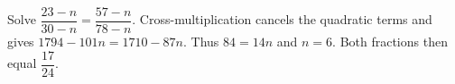 Solve $\dfrac{23-n}{30-n}=\dfrac{57-n}{78-n}$. Cross-multiplication cancels the quadratic terms and gives $1794-101n=1710-87n$. Thus $84=14n$ and $\boxed{n=6}$. Both fractions then equal $\dfrac{17}{24}$.
